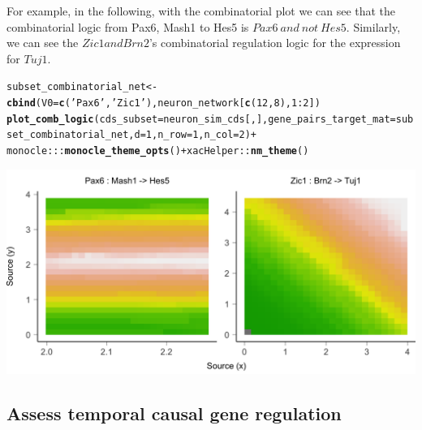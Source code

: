 \documentclass[10pt,oneside]{article}\usepackage[]{graphicx}\usepackage[]{color}
\makeatletter
\def\maxwidth{ %
  \ifdim\Gin@nat@width>\linewidth
    \linewidth
  \else
    \Gin@nat@width
  \fi
}
\newcommand{\hlnum}[1]{\textcolor[rgb]{0.686,0.059,0.569}{#1}}%
\newcommand{\hlstr}[1]{\textcolor[rgb]{0.192,0.494,0.8}{#1}}%
\newcommand{\hlopt}[1]{\textcolor[rgb]{0,0,0}{#1}}%
\newcommand{\hlstd}[1]{\textcolor[rgb]{0.345,0.345,0.345}{#1}}%
\newcommand{\hlkwb}[1]{\textcolor[rgb]{0.69,0.353,0.396}{#1}}%
\newcommand{\hlkwc}[1]{\textcolor[rgb]{0.333,0.667,0.333}{#1}}%
\newcommand{\hlkwd}[1]{\textcolor[rgb]{0.737,0.353,0.396}{\textbf{#1}}}%
\newenvironment{kframe}{%
 \def\at@end@of@kframe{}%
 \ifinner\ifhmode%
  \def\at@end@of@kframe{\end{minipage}}%
  \begin{minipage}{\columnwidth}%
 \fi\fi%
 \def\FrameCommand##1{\hskip\@totalleftmargin \hskip-\fboxsep
 \colorbox{shadecolor}{##1}\hskip-\fboxsep
     \hskip-\linewidth \hskip-\@totalleftmargin \hskip\columnwidth}%
 \MakeFramed {\advance\hsize-\width
   \@totalleftmargin\z@ \linewidth\hsize
   \@setminipage}}%
 {\par\unskip\endMakeFramed%
 \at@end@of@kframe}
\newenvironment{knitrout}{}{} %
\makeatother
\begin{document}
For example, in the following, with the combinatorial plot we can see that the combinatorial logic from Pax6, Mash1 to Hes5 is $Pax6\ and\ not\ Hes5$. Similarly, we can see the $Zic1 and Brn2$'s combinatorial regulation logic for the expression for $Tuj1$. 
\begin{knitrout}
\color{fgcolor}\begin{kframe}
\begin{alltt}
\hlstd{subset_combinatorial_net} \hlkwb{<-} \hlkwd{cbind}\hlstd{(}\hlkwc{V0} \hlstd{=} \hlkwd{c}\hlstd{(}\hlstr{'Pax6'}\hlstd{,} \hlstr{'Zic1'}\hlstd{), neuron_network[}\hlkwd{c}\hlstd{(}\hlnum{12}\hlstd{,} \hlnum{8}\hlstd{),} \hlnum{1}\hlopt{:}\hlnum{2}\hlstd{])}
\hlkwd{plot_comb_logic}\hlstd{(}\hlkwc{cds_subset} \hlstd{= neuron_sim_cds[, ],} \hlkwc{gene_pairs_target_mat} \hlstd{=  subset_combinatorial_net,} \hlkwc{d} \hlstd{=} \hlnum{1}\hlstd{,} \hlkwc{n_row} \hlstd{=} \hlnum{1}\hlstd{,} \hlkwc{n_col} \hlstd{=} \hlnum{2}\hlstd{)} \hlopt{+}
  \hlstd{monocle}\hlopt{:::}\hlkwd{monocle_theme_opts}\hlstd{()} \hlopt{+} \hlstd{xacHelper}\hlopt{::}\hlkwd{nm_theme}\hlstd{()}
\end{alltt}
\end{kframe}

{\centering \includegraphics[width=\maxwidth]{figure/plot_comb_logic-1} 

}



\end{knitrout}

\subsection{Assess temporal causal gene regulation}
\end{document}
